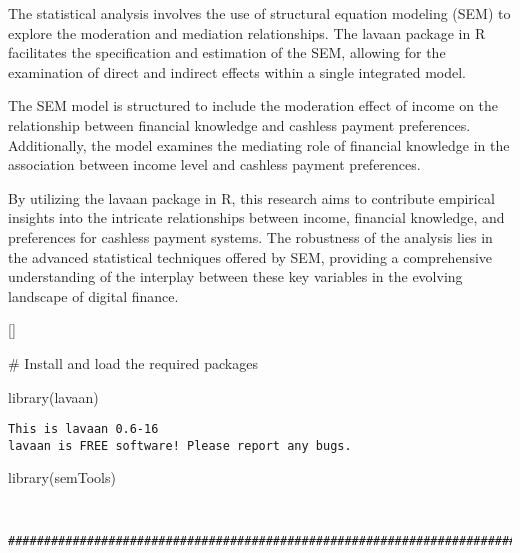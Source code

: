 \documentclass[
  super,
  preprint,
  3p]{elsarticle}
\newenvironment{Shaded}{\begin{snugshade}}{\end{snugshade}}
\newcommand{\CommentTok}[1]{\textcolor[rgb]{0.37,0.37,0.37}{#1}}
\newcommand{\FunctionTok}[1]{\textcolor[rgb]{0.28,0.35,0.67}{#1}}
\newcommand{\NormalTok}[1]{\textcolor[rgb]{0.00,0.23,0.31}{#1}}
\begin{document}
The statistical analysis involves the use of structural equation
modeling (SEM) to explore the moderation and mediation relationships.
The lavaan package in R facilitates the specification and estimation of
the SEM, allowing for the examination of direct and indirect effects
within a single integrated model.

The SEM model is structured to include the moderation effect of income
on the relationship between financial knowledge and cashless payment
preferences. Additionally, the model examines the mediating role of
financial knowledge in the association between income level and cashless
payment preferences.

By utilizing the lavaan package in R, this research aims to contribute
empirical insights into the intricate relationships between income,
financial knowledge, and preferences for cashless payment systems. The
robustness of the analysis lies in the advanced statistical techniques
offered by SEM, providing a comprehensive understanding of the interplay
between these key variables in the evolving landscape of digital
finance.

{[}\citet{hayes2013}{]}\citep{coutts2022}

\citep{mackinnon2002}

\begin{Shaded}
\begin{Highlighting}[]
\CommentTok{\# Install and load the required packages}

\FunctionTok{library}\NormalTok{(lavaan)}
\end{Highlighting}
\end{Shaded}

\begin{verbatim}
This is lavaan 0.6-16
lavaan is FREE software! Please report any bugs.
\end{verbatim}

\begin{Shaded}
\begin{Highlighting}[]
\FunctionTok{library}\NormalTok{(semTools)}
\end{Highlighting}
\end{Shaded}

\begin{verbatim}
 
\end{verbatim}

\begin{verbatim}
###############################################################################
\end{verbatim}
\end{document}

